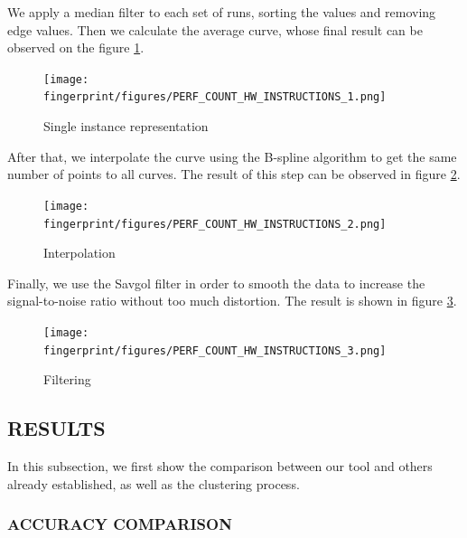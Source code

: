 We apply a median filter to each set of runs, sorting the values and removing edge values.
Then we calculate the average curve, whose final result can be observed on the figure \ref{fig:single_curve}.

\begin{figure}[H]
    \centering
    \texttt{[image: fingerprint/figures/PERF\_COUNT\_HW\_INSTRUCTIONS\_1.png]}
    \caption{Single instance representation}
    \label{fig:single_curve}
\end{figure}

 After that, we interpolate the curve using the B-spline \cite{Hang2017CubicApplications} algorithm to get the same number of points to all curves. 
 The result of this step can be observed in figure \ref{fig:interporlation}. 

\begin{figure}[H]
    \centering
    \texttt{[image: fingerprint/figures/PERF\_COUNT\_HW\_INSTRUCTIONS\_2.png]}
    \caption{Interpolation}
    \label{fig:interporlation}
\end{figure}

Finally, we use the Savgol filter \cite{Luo2005PropertiesDifferentiators} in order to smooth the data to increase the signal-to-noise ratio without too much distortion. The result is shown in figure \ref{fig:filtering}.

\begin{figure}[H]
    \centering
    \texttt{[image: fingerprint/figures/PERF\_COUNT\_HW\_INSTRUCTIONS\_3.png]}
    \caption{Filtering}
    \label{fig:filtering}
\end{figure}

\subsection{RESULTS}

In this subsection, we first show the comparison between our tool and others already established, as well as the clustering process.

\subsubsection{ACCURACY COMPARISON}

